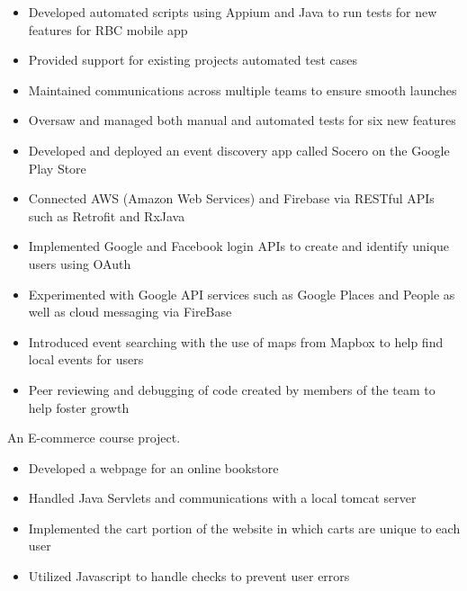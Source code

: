 \documentclass{resume}
\begin{document}
\begin{itemize}
  \item Developed automated scripts using Appium and Java to run tests for new features for RBC mobile app
  \item Provided support for existing projects automated test cases 
  \item Maintained communications across multiple teams to ensure smooth launches
  \item Oversaw and managed both manual and automated tests for six new features
\end{itemize}


\begin{itemize}
  \item Developed and deployed an event discovery app called Socero on the Google Play Store 
  \item Connected AWS (Amazon Web Services) and Firebase via RESTful APIs such as Retrofit and RxJava
  \item Implemented Google and Facebook login APIs to create and identify unique users using OAuth
  \item Experimented with Google API services such as Google Places and People as well as cloud messaging via FireBase
  \item Introduced event searching with the use of maps from Mapbox to help find local events for users
  \item Peer reviewing and debugging of code created by members of the team to help foster growth
\end{itemize}


An E-commerce course project.
\begin{itemize}
  \item Developed a webpage for an online bookstore
  \item Handled Java Servlets and communications with a local tomcat server
  \item Implemented the cart portion of the website in which carts are unique to each user
  \item Utilized Javascript to handle checks to prevent user errors
\end{itemize}

\end{document}
